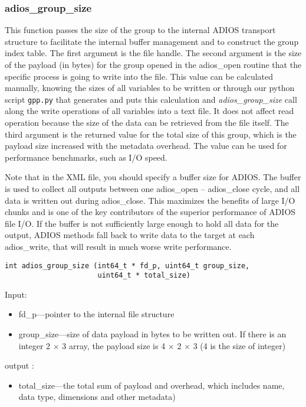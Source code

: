 \subsubsection{adios\_group\_size}
This function passes the size of the group to the internal ADIOS transport structure 
to facilitate the internal buffer management and to construct the group index table. 
The first argument is the file handle. The second argument is the size of the payload 
(in bytes) for the group opened in the adios\_open routine that the specific process 
is going to write into the file. 
This value can be calculated manually, knowing the sizes of all variables to be written 
or through our python script \verb+gpp.py+ that generates and puts this calculation 
and \textit{adios\_group\_size} call along the write operations of all variables into 
a text file. It does not affect read operation because the size 
of the data can be retrieved from the file itself. The third argument is the returned 
value for the total size of this group, which is the payload size increased with the 
metadata overhead. The value can be used for performance benchmarks, such as I/O speed. 

Note that in the XML file, you should specify a buffer size for ADIOS. The buffer is 
used to collect all outputs between one adios\_open -- adios\_close cycle, and all data
is written out during adios\_close. This maximizes the benefits of large I/O chunks and
is one of the key contributors of the superior performance of ADIOS file I/O. 
If the buffer is not sufficiently large enough to hold all data for the output,
ADIOS methods fall back to write data to the target at each adios\_write, that will
result in much worse write performance.

\begin{lstlisting}[alsolanguage=C]
int adios_group_size (int64_t * fd_p, uint64_t group_size, 
                      uint64_t * total_size)
\end{lstlisting}

Input: 
\begin{itemize}
\item fd\_p---pointer to the internal file structure
\item group\_size---size of data payload in bytes to be written out. If there is an integer 
2 $\times$ 3 array, the payload size is 4 $\times$ 2 $\times$ 3 (4 is the size of integer)
\end{itemize}

output :
\begin{itemize}
\item total\_size---the total sum of payload and overhead, which includes name, data 
type, dimensions and other metadata)
\end{itemize}

